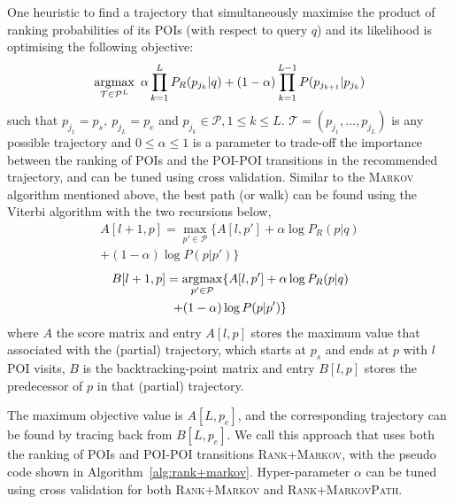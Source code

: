 One heuristic to find a trajectory that simultaneously maximise the product of ranking probabilities
of its POIs (with respect to query $q$) and its likelihood is optimising the following objective:
\begin{equation*}
    \operatorname*{argmax}_{\mathcal{T} \in \mathcal{P}^L} ~\alpha \prod_{k=1}^{L} P_R(p_{j_k} | q) +
                                     (1-\alpha) \prod_{k=1}^{L-1} P(p_{j_{k+1}} | p_{j_k})
\end{equation*}
such that
$p_{j_1} = p_s, ~ p_{j_L} = p_e$ and
$p_{j_k} \in \mathcal{P}, 1 \le k \le L$.
$\mathcal{T} = (p_{j_1}, \dots, p_{j_L})$ is any possible trajectory and
$0 \le \alpha \le 1$ is a parameter to trade-off the importance between the ranking of POIs
and the POI-POI transitions in the recommended trajectory, and can be tuned using cross validation.
Similar to the \textsc{Markov} algorithm mentioned above, 
the best path (or walk) can be found using the Viterbi algorithm with the two recursions below,
\begin{multline}
\label{eq:max}
A[l+1, p] = \max_{p' \in \mathcal{P}} \{ A[l, p'] + \alpha \log P_R(p|q) \\ + (1-\alpha) \log P(p|p') \}
\end{multline}
\begin{multline}
\label{eq:argmax}
B[l+1, p] = \operatorname*{argmax}_{p' \in \mathcal{P}} \{ A[l, p'] + \alpha \log P_R(p|q) \\ + (1-\alpha) \log P(p|p') \}
\end{multline}
where $A$ the score matrix and entry $A[l, p]$ stores the maximum value that associated with the (partial) trajectory, 
which starts at $p_s$ and ends at $p$ with $l$ POI visits,
$B$ is the backtracking-point matrix and entry $B[l, p]$ stores the predecessor of $p$ in that (partial) trajectory.

The maximum objective value is $A[L, p_e]$,
and the corresponding trajectory can be found by tracing back from $B[L, p_e]$.
We call this approach that uses both the ranking of POIs and POI-POI transitions \textsc{Rank+Markov},
with the pseudo code shown in Algorithm~\ref{alg:rank+markov}.
Hyper-parameter $\alpha$ can be tuned using cross validation for both \textsc{Rank+Markov} and \textsc{Rank+MarkovPath}. 



